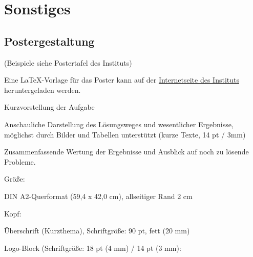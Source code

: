 
\chapter{Sonstiges}
\label{sec:Sonstiges}

\section{Postergestaltung}
\label{sec:Postergestaltung}

(Beispiele siehe Postertafel des Instituts)

Eine \LaTeX{}-Vorlage für das Poster kann auf der \href{http://www.et.tu-dresden.de/ifa/index.php?id=330}{Internetseite des Instituts} heruntergeladen werden.

\begin{compactitem}
  \item Kurzvorstellung der Aufgabe
  \item Anschauliche Darstellung des Lösungsweges und wesentlicher Ergebnisse, möglichst durch Bilder und Tabellen unterstützt (kurze Texte, 14 pt / 3mm)
  \item Zusammenfassende Wertung der Ergebnisse und Ausblick auf noch zu lösende Probleme.
\end{compactitem}

\begin{compactitem}
  \item Größe: 
    \begin{compactitem}
      \item DIN A2-Querformat (59,4 x 42,0 cm), allseitiger Rand 2 cm
  \end{compactitem}
  \item Kopf:
    \begin{compactitem}
      \item Überschrift (Kurzthema), Schriftgröße: 90 pt, fett (20 mm)
      \item Logo-Block (Schriftgröße: 18 pt (4 mm) / 14 pt (3 mm):
    \end{compactitem}
\end{compactitem}

